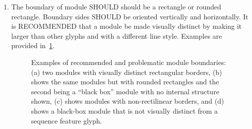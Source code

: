 \begin{enumerate}
\item The boundary of module SHOULD should be a rectangle or rounded rectangle. Boundary sides SHOULD be oriented vertically and horizontally.  
	It is RECOMMENDED that a module be made visually distinct by making it larger than other glyphs and with a different line style.
	Examples are provided in~\ref{exa:moduleA}.

	\begin{figure}[h!]
	\centering
	\caption{Examples of recommended and problematic module boundaries: (a) two modules with visually distinct rectangular borders, (b) shows the same modules but with rounded rectangles and the second being a ``black box'' module with no internal structure shown, (c) shows modules with non-rectilinear borders, and (d) shows a black-box module that is not visually distinct from a sequence feature glyph.}
	\label{exa:moduleA}
	\end{figure}


\end{enumerate}
